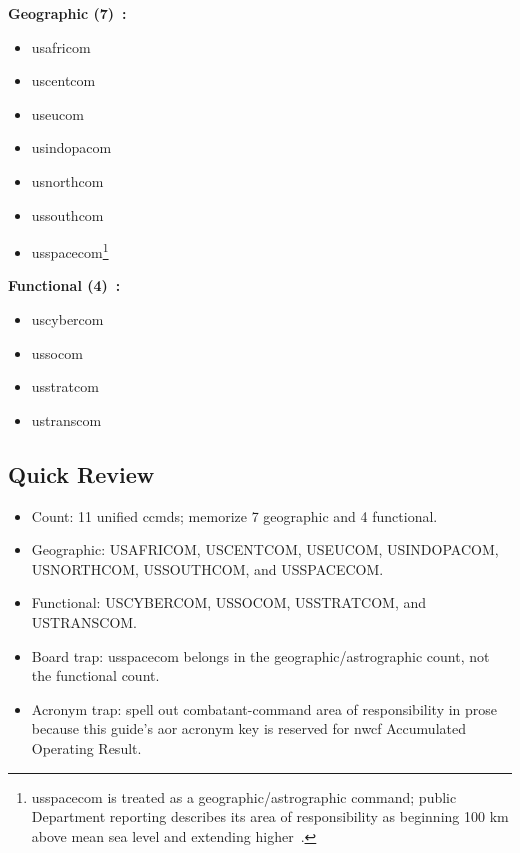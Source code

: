 \documentclass[../main.tex]{subfiles}
\begin{document}
\textbf{Geographic (7)~\autocite{DOW-CombatantCommands-2026,DOW-UnifiedCombatantCommands-2026,DoD-Spacecom-Strategic-Environment-2019}:}
\begin{itemize}
  \item \ac{usafricom}
  \item \ac{uscentcom}
  \item \ac{useucom}
  \item \ac{usindopacom}
  \item \ac{usnorthcom}
  \item \ac{ussouthcom}
  \item \ac{usspacecom}\footnote{\ac{usspacecom} is treated as a geographic/astrographic command; public Department reporting describes its area of responsibility as beginning 100 km above mean sea level and extending higher~\autocite{DoD-Spacecom-Strategic-Environment-2019}.}
\end{itemize}
\textbf{Functional (4)~\autocite{DOW-CombatantCommands-2026,DOW-UnifiedCombatantCommands-2026}:}
\begin{itemize}
  \item \ac{uscybercom}
  \item \ac{ussocom}
  \item \ac{usstratcom}
  \item \ac{ustranscom}
\end{itemize}

\subsection{Quick Review}
\begin{itemize}
  \item Count: 11 unified \acp{ccmd}; memorize 7 geographic and 4 functional.
  \item Geographic: USAFRICOM, USCENTCOM, USEUCOM, USINDOPACOM, USNORTHCOM, USSOUTHCOM, and USSPACECOM.
  \item Functional: USCYBERCOM, USSOCOM, USSTRATCOM, and USTRANSCOM.
  \item Board trap: \ac{usspacecom} belongs in the geographic/astrographic count, not the functional count.
  \item Acronym trap: spell out combatant-command area of responsibility in prose because this guide's \ac{aor} acronym key is reserved for \ac{nwcf} Accumulated Operating Result.
\end{itemize}

\end{document}
